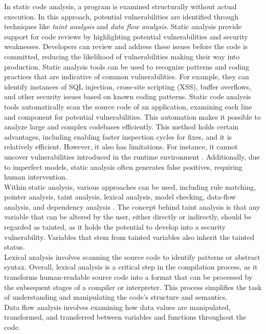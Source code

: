 In static code analysis, a program is examined structurally without actual execution. In this approach, potential vulnerabilities are identified \cite{5066568} through techniques like \textit{taint analysis} and \textit{data flow analysis}. Static analysis provide support for code reviews by highlighting potential vulnerabilities and security weaknesses. Developers can review and address these issues before the code is committed, reducing the likelihood of vulnerabilities making their way into production. Static analysis tools can be used to recognize patterns and coding practices that are indicative of common vulnerabilities. For example, they can identify instances of SQL injection, cross-site scripting (XSS), buffer overflows, and other security issues based on known coding patterns. Static code analysis tools automatically scan the source code of an application, examining each line and component for potential vulnerabilities. This automation makes it possible to analyze large and complex codebases efficiently. This method holds certain advantages, including enabling faster inspection cycles for fixes, and it is relatively efficient. However, it also has limitations. For instance, it cannot uncover vulnerabilities introduced in the runtime environment \cite{5066568}. Additionally, due to imperfect models, static analysis often generates false positives, requiring human intervention.\\

Within static analysis, various approaches can be used, including rule matching, pointer analysis, taint analysis, lexical analysis, model checking, data-flow analysis, and dependency analysis \cite{Mukesh_Kumar_2015, Bingchang_2012}. The concept behind taint analysis is that any variable that can be altered by the user, either directly or indirectly, should be regarded as tainted, as it holds the potential to develop into a security vulnerability. Variables that stem from tainted variables also inherit the tainted status.\\ 

Lexical analysis involves scanning the source code to identify patterns or abstract syntax. Overall, lexical analysis is a critical step in the compilation process, as it transforms human-readable source code into a format that can be processed by the subsequent stages of a compiler or interpreter. This process simplifies the task of understanding and manipulating the code's structure and semantics.\\

Data flow analysis involves examining how data values are manipulated, transformed, and transferred between variables and functions throughout the code.\\


